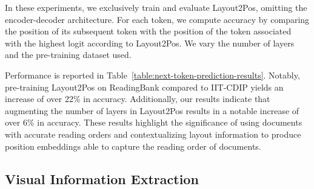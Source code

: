 In these experiments, we exclusively train and evaluate Layout2Pos, omitting the encoder-decoder architecture. For each token, we compute accuracy by comparing the position of its subsequent token with the position of the token associated with the highest logit according to Layout2Pos. We vary the number of layers and the pre-training dataset used. 

Performance is reported in Table~\ref{table:next-token-prediction-results}. Notably, pre-training Layout2Pos on ReadingBank compared to IIT-CDIP yields an increase of over 22\% in accuracy. Additionally, our results indicate that augmenting the number of layers in Layout2Pos results in a notable increase of over 6\% in accuracy. These results highlight the significance of using documents with accurate reading orders and contextualizing layout information to produce position embeddings able to capture the reading order of documents.

\subsection{Visual Information Extraction}

